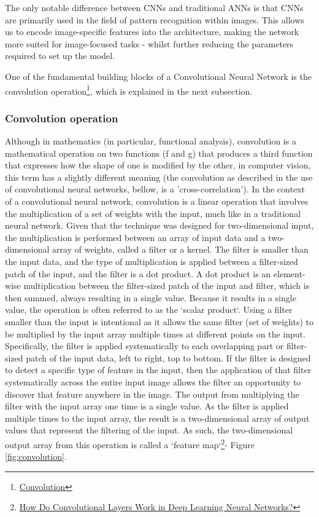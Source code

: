 The only notable difference between CNNs and traditional ANNs is that CNNs are primarily used in the field of pattern recognition within images. This allows us to encode image-specific features into the architecture, making the network more suited for image-focused tasks - whilst further reducing the parameters required to set up the model.

One of the fundamental building blocks of a Convolutional Neural Network is the convolution operation\footnote{\href{https://en.wikipedia.org/wiki/Convolution}{Convolution}}, which is explained in the next subsection. 
 
\subsubsection{Convolution operation}
Although in mathematics (in particular, functional analysis), convolution is a mathematical operation on two functions (f and g) that produces a third function that expresses how the shape of one is modified by the other, in computer vision, this term has a slightly different meaning (the convolution as described in the use of convolutional neural networks, bellow, is a 'cross-correlation'). In the context of a convolutional neural network, convolution is a linear operation that involves the multiplication of a set of weights with the input, much like in a traditional neural network. Given that the technique was designed for two-dimensional input, the multiplication is performed between an array of input data and a two-dimensional array of weights, called a filter or a kernel.
The filter is smaller than the input data, and the type of multiplication is applied between a filter-sized patch of the input, and the filter is a dot product. A dot product is an element-wise multiplication between the filter-sized patch of the input and filter, which is then summed, always resulting in a single value. Because it results in a single value, the operation is often referred to as the `scalar product`.
Using a filter smaller than the input is intentional as it allows the same filter (set of weights) to be multiplied by the input array multiple times at different points on the input. Specifically, the filter is applied systematically to each overlapping part or filter-sized patch of the input data, left to right, top to bottom.
If the filter is designed to detect a specific type of feature in the input, then the application of that filter systematically across the entire input image allows the filter an opportunity to discover that feature anywhere in the image.
The output from multiplying the filter with the input array one time is a single value. As the filter is applied multiple times to the input array, the result is a two-dimensional array of output values that represent the filtering of the input. As such, the two-dimensional output array from this operation is called a `feature map`\footnote{\href{https://machinelearningmastery.com/convolutional-layers-for-deep-learning-neural-networks/}{How Do Convolutional Layers Work in Deep Learning Neural Networks?}}- Figure \ref{fig:convolution}.

